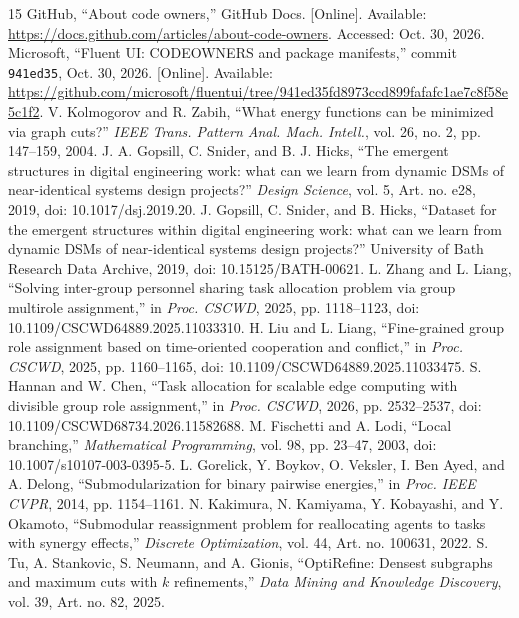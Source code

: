 \documentclass[conference]{IEEEtran}
\begin{document}
\begin{thebibliography}{15}
 GitHub, ``About code owners,'' GitHub Docs. [Online]. Available: \url{https://docs.github.com/articles/about-code-owners}. Accessed: Oct. 30, 2026.
 Microsoft, ``Fluent UI: CODEOWNERS and package manifests,'' commit \texttt{941ed35}, Oct. 30, 2026. [Online]. Available: \url{https://github.com/microsoft/fluentui/tree/941ed35fd8973ccd899fafafc1ae7c8f58e5c1f2}.
 V. Kolmogorov and R. Zabih, ``What energy functions can be minimized via graph cuts?'' \emph{IEEE Trans. Pattern Anal. Mach. Intell.}, vol. 26, no. 2, pp. 147--159, 2004.
 J. A. Gopsill, C. Snider, and B. J. Hicks, ``The emergent structures in digital engineering work: what can we learn from dynamic DSMs of near-identical systems design projects?'' \emph{Design Science}, vol. 5, Art. no. e28, 2019, doi: 10.1017/dsj.2019.20.
 J. Gopsill, C. Snider, and B. Hicks, ``Dataset for the emergent structures within digital engineering work: what can we learn from dynamic DSMs of near-identical systems design projects?'' University of Bath Research Data Archive, 2019, doi: 10.15125/BATH-00621.
 L. Zhang and L. Liang, ``Solving inter-group personnel sharing task allocation problem via group multirole assignment,'' in \emph{Proc. CSCWD}, 2025, pp. 1118--1123, doi: 10.1109/CSCWD64889.2025.11033310.
 H. Liu and L. Liang, ``Fine-grained group role assignment based on time-oriented cooperation and conflict,'' in \emph{Proc. CSCWD}, 2025, pp. 1160--1165, doi: 10.1109/CSCWD64889.2025.11033475.
 S. Hannan and W. Chen, ``Task allocation for scalable edge computing with divisible group role assignment,'' in \emph{Proc. CSCWD}, 2026, pp. 2532--2537, doi: 10.1109/CSCWD68734.2026.11582688.
 M. Fischetti and A. Lodi, ``Local branching,'' \emph{Mathematical Programming}, vol. 98, pp. 23--47, 2003, doi: 10.1007/s10107-003-0395-5.
 L. Gorelick, Y. Boykov, O. Veksler, I. Ben Ayed, and A. Delong, ``Submodularization for binary pairwise energies,'' in \emph{Proc. IEEE CVPR}, 2014, pp. 1154--1161.
 N. Kakimura, N. Kamiyama, Y. Kobayashi, and Y. Okamoto, ``Submodular reassignment problem for reallocating agents to tasks with synergy effects,'' \emph{Discrete Optimization}, vol. 44, Art. no. 100631, 2022.
 S. Tu, A. Stankovic, S. Neumann, and A. Gionis, ``OptiRefine: Densest subgraphs and maximum cuts with $k$ refinements,'' \emph{Data Mining and Knowledge Discovery}, vol. 39, Art. no. 82, 2025.

\end{thebibliography}
\end{document}
